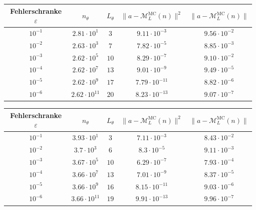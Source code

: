 \documentclass{standalone}
\begin{document}
\begin{tabular}{c|c|c|c|c}
Fehlerschranke $\varepsilon$ & $n_\theta$ & $L_\theta$ & $\|a-\mathcal{M}_L^{\text{MC}}(n)\|^2$ & $\|a-\mathcal{M}_L^{\text{MC}}(n)\|$\\
\hline
$10^{-1}$  &  $2.81 \cdot 10^{1}$ &   $3$  &  $9.11 \cdot 10^{-3}$  & $9.56 \cdot 10^{-2}$\\
$10^{-2}$    & $2.63 \cdot 10^{3}$ &   $7$  &  $7.82 \cdot 10^{-5}$  & $8.85 \cdot 10^{-3}$\\
$10^{-3}$    & $2.62 \cdot 10^{5}$  &  $10$  &  $8.29 \cdot 10^{-7}$  & $9.10 \cdot 10^{-2}$\\
$10^{-4}$    &  $2.62 \cdot 10^{7}$ &   $13$  &  $9.01 \cdot 10^{-9}$ & $9.49 \cdot 10^{-5}$\\
$10^{-5}$ &   $2.62 \cdot 10^{9}$ &   $17$ &   $7.79 \cdot 10^{-11}$ & $8.82 \cdot 10^{-6}$  \\
$10^{-6}$&   $2.62 \cdot 10^{11}$  &  $20$  &  $8.23 \cdot 10^{-13}$ & $9.07 \cdot 10^{-7}$ \\ 
\hline 
 \end{tabular}
 


\begin{tabular}{c|c|c|c|c}
Fehlerschranke $\varepsilon$ & $n_\theta$ & $L_\theta$ & $\|a-\mathcal{M}_L^{\text{MC}}(n)\|^2$ & $\|a-\mathcal{M}_L^{\text{MC}}(n)\|$\\
\hline
$10^{-1}$  &  $3.93 \cdot 10^{1}$ &   $3$  &  $7.11 \cdot 10^{-3}$ & $8.43 \cdot 10^{-2}$\\
$10^{-2}$    & $3.7 \cdot 10^{3}$ &   $6$  &  $8.3 \cdot 10^{-5}$  & $9.11 \cdot 10^{-3}$\\
$10^{-3}$    & $3.67 \cdot 10^{5}$  &  $10$  &  $6.29 \cdot 10^{-7}$  & $7.93 \cdot 10^{-4}$\\
$10^{-4}$    &  $3.66 \cdot 10^{7}$ &   $13$  &  $7.01 \cdot 10^{-9}$ & $8.37 \cdot 10^{-5}$\\
$10^{-5}$ &   $3.66 \cdot 10^{9}$ &   $16$ &   $8.15 \cdot 10^{-11}$ & $9.03 \cdot 10^{-6}$\\
$10^{-6}$&   $3.66 \cdot 10^{11}$  &  $19$  &  $9.91 \cdot 10^{-13}$& $9.96 \cdot 10^{-7}$ \\ 
\hline 
 \end{tabular}
 
\end{document}
